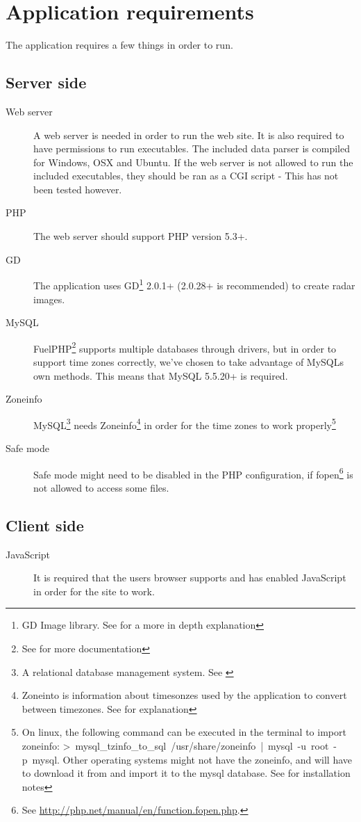 \chapter{Application requirements}
\label{sec:application_requirements}
The application requires a few things in order to run.

\section{Server side}
\begin{description}
\item[Web server] A web server is needed in order to run the web site. It is also required to have permissions to run executables. The included data parser is compiled for Windows, OSX and Ubuntu. If the web server is not allowed to run the included executables, they should be ran as a CGI script - This has not been tested however.
\item[PHP] The web server should support PHP version 5.3+.
\item[GD] The application uses GD\footnote{GD Image library. See \cite{GD} for a more in depth explanation} 2.0.1+ (2.0.28+ is recommended) to create radar images.
\item[MySQL] FuelPHP\footnote{See \cite{FuelPHP} for more documentation} supports multiple databases through drivers, but in order to support time zones correctly, we've chosen to take advantage of MySQLs own methods. This means that MySQL 5.5.20+ is required.
\item[Zoneinfo] MySQL\footnote{A relational database management system. See \cite{MySQL}} needs Zoneinfo\footnote{Zoneinto is information about timesonzes used by the application to convert between timezones. See \cite{Zoneinfo} for explanation} in order for the time zones to work properly\footnote{On linux, the following command can be executed in the terminal to import zoneinfo: \mbox{\textsf{> mysql\_tzinfo\_to\_sql /usr/share/zoneinfo | mysql -u root -p mysql}}. Other operating systems might not have the zoneinfo, and will have to download it from \cite{Zoneinfo_download} and import it to the mysql database. See \cite{Zoneinfo_install} for installation notes}
\item[Safe mode] Safe mode might need to be disabled in the PHP configuration, if \textsf{fopen}\footnote{See \url{http://php.net/manual/en/function.fopen.php}.} is not allowed to access some files.
\end{description}

\section{Client side}
\begin{description}
\item[JavaScript] It is required that the users browser supports and has enabled JavaScript in order for the site to work.
\end{description}